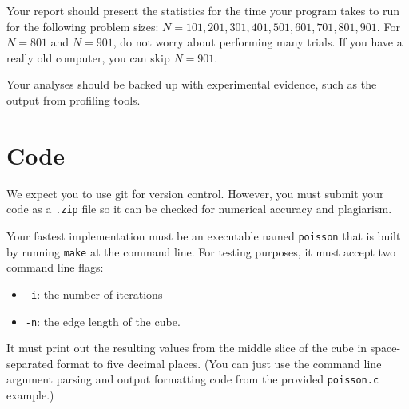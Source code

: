 \documentclass[a4paper,11pt]{article}
\newcommand{\code}[1]{\texttt{#1}}
\begin{document}
Your report should present the statistics for the time your program
takes to run for the following problem sizes: $N=101, 201, 301, 401,
501, 601, 701, 801, 901$.  For $N=801$ and $N=901$, do not worry about
performing many trials.  If you have a really old computer, you can
skip $N=901$.

Your analyses should be backed up with experimental evidence, such as
the output from profiling tools.




\section{Code}

We expect you to use git for version control.  However, you must
submit your code as a \code{.zip} file so it can be checked for
numerical accuracy and plagiarism.

Your fastest implementation must be an executable named \code{poisson}
that is built by running \code{make} at the command line.  For testing
purposes, it must accept two command line flags:
\begin{itemize}
  \item \code{-i}: the number of iterations
  \item \code{-n}: the edge length of the cube.
\end{itemize}
It must print out the resulting values from the middle slice of the
cube in space-separated format to five decimal places.  (You can just
use the command line argument parsing and output formatting code from
the provided \code{poisson.c} example.)
\end{document}
